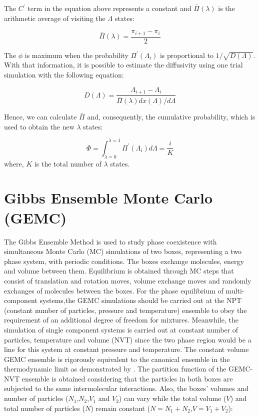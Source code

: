 The $C^{'} $ term in the equation above represents a constant and $\bar{\Pi} (\lambda)$ is the arithmetic average of visiting the $\Lambda$ states:

\begin{equation}
\bar{\Pi} (\lambda) = \dfrac{\pi_{i+1} - \pi_{i}}{2}
\label{eqn:barplambda}
\end{equation}

The $\phi$ is maximum when the probability $\Pi^{'}(\Lambda_{i})$ is proportional to $1/\sqrt{D(\Lambda)}$. With that information, it is possible to estimate the diffusivity using one trial simulation with the following equation:

\begin{equation}
D(\Lambda) = \dfrac{\Lambda_{i+1} - \Lambda_{i}}{\bar{\Pi} (\lambda) {dx(\Lambda)}/{d \Lambda}}
\label{eqn:diff}
\end{equation}

Hence, we can calculate $\bar{\Pi} $ and, consequently, the cumulative probability, which is used to obtain the new $\lambda$ states:

\begin{equation}
\Phi = \int_{\lambda =0}^{\lambda =1} \Pi^{'}(\Lambda_{i}) d \Lambda = \dfrac{i}{K}
\label{eqn:cumfun}
\end{equation}
where, $K$ is the total number of $\lambda$ states. 

\section{Gibbs Ensemble Monte Carlo (GEMC)}\label{gemc}

The Gibbs Ensemble Method \cite{papa1987} is used to study phase coexistence with simultaneous Monte Carlo (MC) simulations of two boxes,  representing a two phase system, with periodic conditions. The boxes exchange molecules, energy and volume between them. Equilibrium is obtained through MC steps that consist of translation and rotation moves, volume exchange moves and randomly exchanges of molecules between the boxes. For the phase equilibrium of multi-component systems,the GEMC simulations should be carried out at the NPT (constant number of particles, pressure and temperature) ensemble to obey the requirement of an additional degree of freedom for mixtures. Meanwhile, the simulation of single component systems is carried out at constant number of particles, temperature and volume (NVT) since the two phase region would be a line for this system at constant pressure and temperature. The constant volume GEMC ensemble is rigorously equivalent to the canonical ensemble in the thermodynamic limit as demonstrated by . The partition function of the GEMC-NVT ensemble is obtained considering that the particles in both boxes are subjected to the same intermolecular interactions. Also, the boxes’ volumes and number of particles ($N_{1}$,$N_{2}$,$V_{1}$ and $V_{2}$) can vary while the total volume ($V$) and total number of particles ($N$) remain constant ($N = N_{1} + N_{2}$,$V = V_{1} + V_{2}$):

